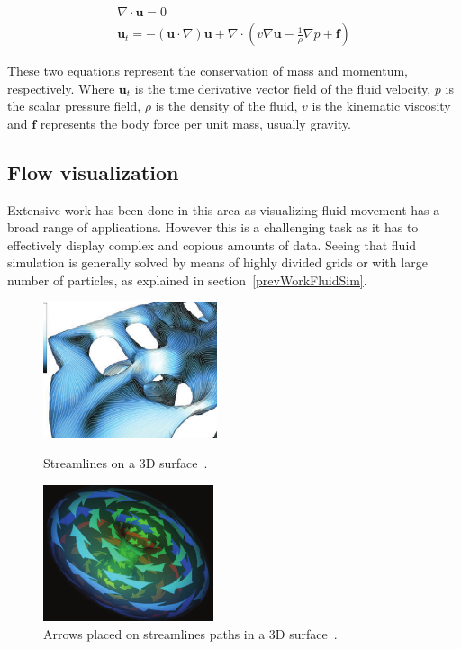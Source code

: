 \documentclass[11pt]{report}
\begin{document}
\begin{gather}
\label{eq:navierStokes1}
\nabla \cdot \mathbf{u} = 0\\
\label{eq:navierStokes2}
\mathbf{u}_t = -(\mathbf{u} \cdot \nabla)\mathbf{u} + \nabla \cdot ( v \nabla \mathbf{u} - \frac{1}{\rho} \nabla p + \mathbf{f} )
\end{gather}

These two equations represent the conservation of mass and momentum, respectively.
Where $\mathbf{u}_t$ is the time derivative vector field of the fluid velocity, $p$  is the scalar pressure field, $\rho$ is the density of the fluid, $v$ is the kinematic viscosity and $\mathbf{f}$ represents the body force per unit mass, usually gravity.

\subsection{Flow visualization}

Extensive work has been done in this area as visualizing fluid movement has a broad range of applications.
However this is a challenging task as it has to effectively display complex and copious amounts of data.
Seeing that fluid simulation is generally solved by means of highly divided grids or with large number of particles, as explained in section~\ref{prevWorkFluidSim}.\\

\begin{figure}
	\centering
	\begin{minipage}[t]{.45\textwidth}
		\centering
		\includegraphics[width=.8\textwidth,height=4cm]{images/streamLinesSpencer}
		\caption{Streamlines on a 3D surface~\cite{Spencer2009}.}
		\label{fig:streamLines}
	\end{minipage}\hfill
	\begin{minipage}[t]{.45\textwidth}
		\centering
		\includegraphics[width=.8\textwidth,height=4cm]{images/streamArrows}
		\caption{Arrows placed on streamlines paths in a 3D surface~\cite{loffelmann1998}.}
		\label{fig:streamArrows}
	\end{minipage}
\end{figure}
\end{document}
